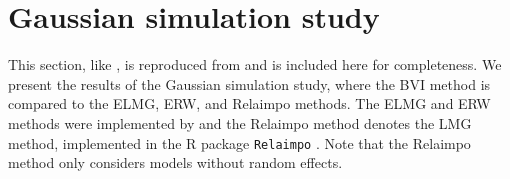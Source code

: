 \section{Gaussian simulation study}
\label{sec:simulation_study_gauss}
This section, like , is reproduced from \citet{Arnstad:Relative_variable_importance_in_Bayesian_linear_mixed_models:2024} and is included here for completeness. We present the results of the Gaussian simulation study, where the BVI method is compared to the ELMG, ERW, and Relaimpo methods. The ELMG and ERW methods were implemented by \citet{matre} and the Relaimpo method denotes the LMG method, implemented in the R package \texttt{Relaimpo} \citep{gromping_relaimpo}. Note that the Relaimpo method only considers models without random effects.

